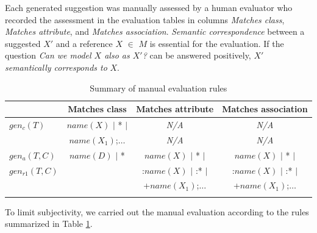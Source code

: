 Each generated suggestion was manually assessed by a human evaluator who recorded the assessment in the evaluation tables in columns \emph{Matches class}, \emph{Matches attribute}, and \emph{Matches association}.
\emph{Semantic correspondence} between a suggested $X'$ and a reference $X$ $\in$ $M$ is essential for the evaluation.
If the question \emph{Can we model $X$ also as $X'$?} can be answered positively, $X'$ \emph{semantically corresponds to} $X$.

\begin{table}[!h]
    \scriptsize
    \centering
    \setlength{\tabcolsep}{0.5em}
    \begin{tabular}{lccc}
             & Matches class & Matches attribute & Matches association \\
\toprule
\addlinespace
        $gen_c(T)$   & $name(X)$ $\vert$ * $\vert$ & \emph{N/A}  & \emph{N/A} \\
                     & $name(X_1)$;$\ldots$        & \emph{N/A}  & \emph{N/A} \\
\addlinespace
\midrule
\addlinespace
        $gen_a(T,C)$ & $name(D)$ $\vert$ *         & $name(X)$ $\vert$ * $\vert$ & $name(X)$ $\vert$ * $\vert$ \\
        $gen_{r1}(T,C)$ &                             & :$name(X)$ $\vert$ :* $\vert$ & :$name(X)$ $\vert$ :* $\vert$ \\
                     &                             & +$name(X_1)$;$\ldots$        & +$name(X_1)$;$\ldots$ \\
\addlinespace
\bottomrule
    \end{tabular}
    \caption{Summary of manual evaluation rules}
    \label{tab:manual-assessment-of-suggestions}
\end{table}

To limit subjectivity, we carried out the manual evaluation according to the rules summarized in Table \ref{tab:manual-assessment-of-suggestions}.


